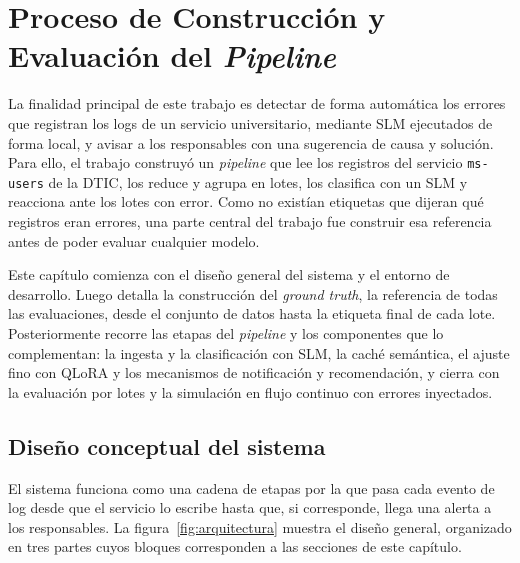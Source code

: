 \chapter{Proceso de Construcción y Evaluación del \textit{Pipeline}} \label{cap:metodologia}

La finalidad principal de este trabajo es detectar de forma automática los errores que registran los logs de un servicio universitario, mediante SLM ejecutados de forma local, y avisar a los responsables con una sugerencia de causa y solución. Para ello, el trabajo construyó un \textit{pipeline} que lee los registros del servicio \texttt{ms-users} de la DTIC, los reduce y agrupa en lotes, los clasifica con un SLM y reacciona ante los lotes con error. Como no existían etiquetas que dijeran qué registros eran errores, una parte central del trabajo fue construir esa referencia antes de poder evaluar cualquier modelo.

Este capítulo comienza con el diseño general del sistema y el entorno de desarrollo. Luego detalla la construcción del \textit{ground truth}, la referencia de todas las evaluaciones, desde el conjunto de datos hasta la etiqueta final de cada lote. Posteriormente recorre las etapas del \textit{pipeline} y los componentes que lo complementan: la ingesta y la clasificación con SLM, la caché semántica, el ajuste fino con QLoRA y los mecanismos de notificación y recomendación, y cierra con la evaluación por lotes y la simulación en flujo continuo con errores inyectados.

\section{Diseño conceptual del sistema}\label{sec:met_vision}

El sistema funciona como una cadena de etapas por la que pasa cada evento de log desde que el servicio lo escribe hasta que, si corresponde, llega una alerta a los responsables. La figura~\ref{fig:arquitectura} muestra el diseño general, organizado en tres partes cuyos bloques corresponden a las secciones de este capítulo.

